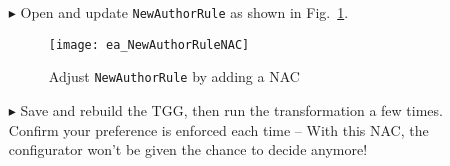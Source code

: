 \begin{itemize}

\item[$\blacktriangleright$] Open and update \texttt{NewAuthorRule} as shown in Fig.~\ref{ea:existingAuthorNAC}.

\begin{figure}[htbp]
\begin{center}
  \texttt{[image: ea\_NewAuthorRuleNAC]}
  \caption{Adjust \texttt{NewAuthorRule} by adding a NAC}
  \label{ea:existingAuthorNAC}
\end{center}
\end{figure}

\vspace{0.5cm}

\item[$\blacktriangleright$] Save and rebuild the TGG, then run the transformation a few times. Confirm your preference is enforced each time -- With this NAC,
the configurator won't be given the chance to decide anymore!

\end{itemize}
